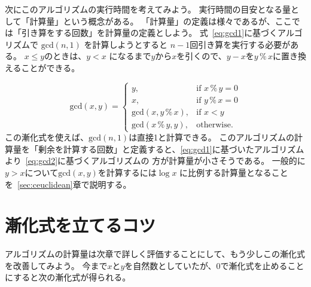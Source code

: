\documentclass[a4paper,twoside,onecolumn,openany,article,10pt]{memoir}
\theoremstyle{remark}
\begin{document}
次にこのアルゴリズムの実行時間を考えてみよう。
実行時間の目安となる量として「計算量」という概念がある。
「計算量」の定義は様々であるが、ここでは「引き算をする回数」を計算量の定義としよう。
式~\eqref{eq:gcd1}に基づくアルゴリズムで $\mathrm{gcd}(n, 1)$ を計算しようとすると $n-1$回引き算を実行する必要がある。
$x\le y$のときは、$y < x$ になるまで$y$から$x$を引くので、$y-x$を$y\,\%\,x$に置き換えることができる。

\begin{equation}
\mathrm{gcd}(x, y) =
\begin{cases}
y,& \text{if } x \,\%\, y = 0\\
x,& \text{if } y \,\%\, x = 0\\
\mathrm{gcd}(x, y\, \%\, x),& \text{if } x< y\\
\mathrm{gcd}(x\, \%\, y, y),& \text{otherwise.}
\end{cases}
\label{eq:gcd2}
\end{equation}
この漸化式を使えば、$\mathrm{gcd}(n,1)$は直接1と計算できる。
このアルゴリズムの計算量を「剰余を計算する回数」と定義すると、\eqref{eq:gcd1}に基づいたアルゴリズムより~\eqref{eq:gcd2}に基づくアルゴリズムの
方が計算量が小さそうである。
一般的に$y>x$について$\mathrm{gcd}(x, y)$を計算するには$\log x$ に比例する計算量となることを~\ref{sec:ceuclidean}章で説明する。

\section{漸化式を立てるコツ}
アルゴリズムの計算量は次章で詳しく評価することにして、もう少しこの漸化式を改善してみよう。
今まで$x$と$y$を自然数としていたが、0で漸化式を止めることにすると次の漸化式が得られる。
\end{document}
